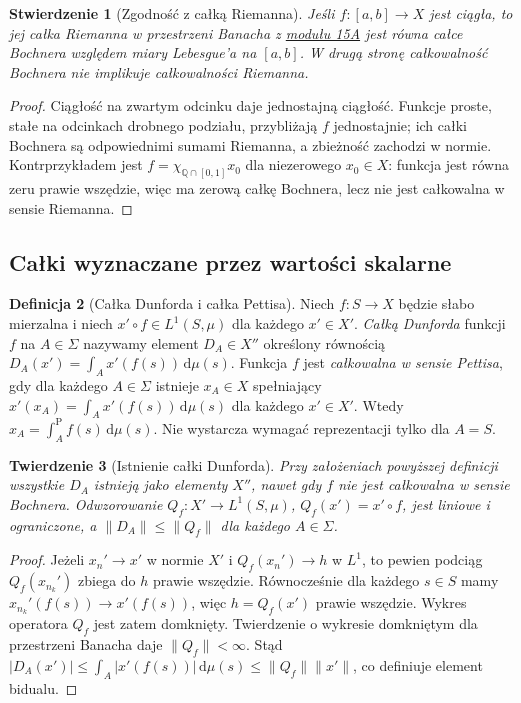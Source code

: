\documentclass[11pt,a4paper]{article}
\numberwithin{equation}{section}
\theoremstyle{plain}
\newtheorem{twierdzenie}{Twierdzenie}[section]
\newtheorem{stwierdzenie}[twierdzenie]{Stwierdzenie}
\theoremstyle{definition}
\newtheorem{definicja}[twierdzenie]{Definicja}
\theoremstyle{remark}
\begin{document}
\begin{stwierdzenie}[Zgodność z całką Riemanna]
\label{prop:riemann-bochner15b}
Jeśli $f:[a,b]\to X$ jest ciągła, to jej całka Riemanna
w przestrzeni Banacha z \hyperref[sec:integral-lcs15a]{modułu 15A} jest równa całce Bochnera
względem miary Lebesgue'a na $[a,b]$. W drugą stronę
całkowalność Bochnera nie implikuje całkowalności Riemanna.
\end{stwierdzenie}
\begin{proof}
Ciągłość na zwartym odcinku daje jednostajną ciągłość.
Funkcje proste, stałe na odcinkach drobnego podziału,
przybliżają $f$ jednostajnie; ich całki Bochnera są
odpowiednimi sumami Riemanna, a zbieżność zachodzi w normie.
Kontrprzykładem jest $f=\chi_{\mathbb Q\cap[0,1]}x_0$
dla niezerowego $x_0\in X$: funkcja jest równa zeru prawie
wszędzie, więc ma zerową całkę Bochnera, lecz nie jest
całkowalna w sensie Riemanna.
\end{proof}

\subsection{Całki wyznaczane przez wartości skalarne}

\begin{definicja}[Całka Dunforda i całka Pettisa]
\label{def:dunford-pettis15b}
Niech $f:S\to X$ będzie słabo mierzalna i niech
$x'\circ f\in L^1(S,\mu)$ dla każdego $x'\in X'$.
\emph{Całką Dunforda} funkcji $f$ na $A\in\Sigma$ nazywamy
element $D_A\in X''$ określony równością
$D_A(x')=\int_Ax'(f(s))\,\mathrm d\mu(s)$.
Funkcja $f$ jest \emph{całkowalna w sensie Pettisa}, gdy
dla każdego $A\in\Sigma$ istnieje $x_A\in X$ spełniający
$x'(x_A)=\int_Ax'(f(s))\,\mathrm d\mu(s)$ dla każdego
$x'\in X'$. Wtedy $x_A=\int_A^{\mathrm P} f(s)\,\mathrm d\mu(s)$.
Nie wystarcza wymagać reprezentacji tylko dla $A=S$.
\end{definicja}

\begin{twierdzenie}[Istnienie całki Dunforda]
\label{thm:dunford-closedgraph15b}
Przy założeniach powyższej definicji wszystkie $D_A$
istnieją jako elementy $X''$, nawet gdy $f$ nie jest
całkowalna w sensie Bochnera. Odwzorowanie
$Q_f:X'\to L^1(S,\mu)$, $Q_f(x')=x'\circ f$, jest
liniowe i ograniczone, a
$\|D_A\|\le\|Q_f\|$ dla każdego $A\in\Sigma$.
\end{twierdzenie}
\begin{proof}
Jeżeli $x_n'\to x'$ w normie $X'$ i
$Q_f(x_n')\to h$ w $L^1$, to pewien podciąg
$Q_f(x_{n_k}')$ zbiega do $h$ prawie wszędzie.
Równocześnie dla każdego $s\in S$ mamy
$x_{n_k}'(f(s))\to x'(f(s))$, więc $h=Q_f(x')$ prawie
wszędzie. Wykres operatora $Q_f$ jest zatem domknięty.
Twierdzenie o wykresie domkniętym dla przestrzeni Banacha
daje $\|Q_f\|<\infty$. Stąd
$|D_A(x')|\le\int_A|x'(f(s))|\,\mathrm d\mu(s)
\le\|Q_f\|\|x'\|$, co definiuje element bidualu.
\end{proof}
\end{document}

